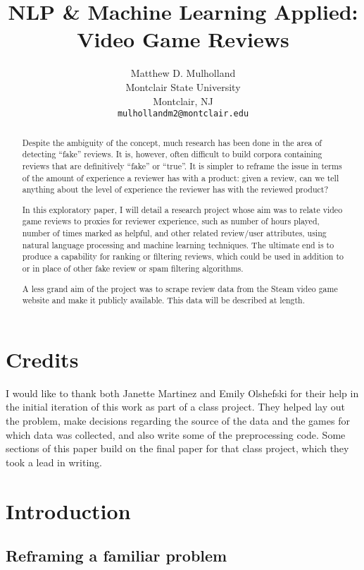\documentclass[9pt]{article}
\title{NLP \& Machine Learning Applied: Video Game Reviews}
\author{Matthew D. Mulholland \\
  Montclair State University \\
  Montclair, NJ \\
  {\tt mulhollandm2@montclair.edu}}
\date{}
\begin{document}
\maketitle
\begin{abstract}
Despite the ambiguity of the concept, much research has been done in the area of detecting ``fake'' reviews. It is, however, often difficult to build corpora containing reviews that are definitively ``fake'' or ``true''. It is simpler to reframe the issue in terms of the amount of experience a reviewer has with a product: given a review, can we tell anything about the level of experience the reviewer has with the reviewed product?

In this exploratory paper, I will detail a research project whose aim was to relate video game reviews to proxies for reviewer experience, such as number of hours played, number of times marked as helpful, and other related review/user attributes, using natural language processing and machine learning techniques. The ultimate end is to produce a capability for ranking or filtering reviews, which could be used in addition to or in place of other fake review or spam filtering algorithms.

A less grand aim of the project was to scrape review data from the Steam video game website and make it publicly available. This data will be described at length.
\end{abstract}

\section{Credits}

I would like to thank both Janette Martinez and Emily Olshefski for their help in the initial iteration of this work as part of a class project. They helped lay out the problem, make decisions regarding the source of the data and the games for which data was collected, and also write some of the preprocessing code. Some sections of this paper build on the final paper for that class project, which they took a lead in writing.

\section{Introduction}

\subsection{Reframing a familiar problem}
\end{document}

